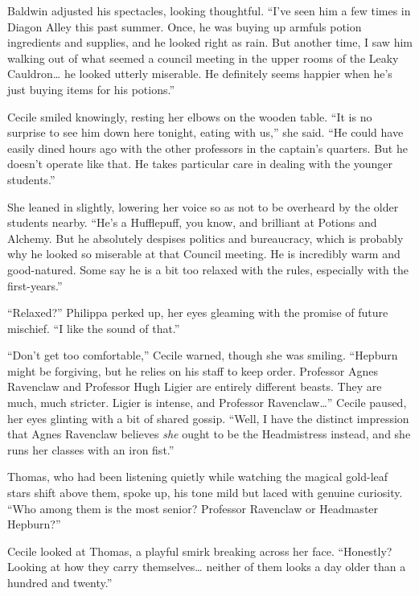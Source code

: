 Baldwin adjusted his spectacles, looking thoughtful. \enquote{I've seen him a few times in Diagon Alley this past summer. Once, he was buying up armfuls potion ingredients and supplies, and he looked right as rain. But another time, I saw him walking out of what seemed a council meeting in the upper rooms of the Leaky Cauldron\ldots{} he looked utterly miserable. He definitely seems happier when he's just buying items for his potions.}

Cecile smiled knowingly, resting her elbows on the wooden table. \enquote{It is no surprise to see him down here tonight, eating with us,} she said. \enquote{He could have easily dined hours ago with the other professors in the captain's quarters. But he doesn't operate like that. He takes particular care in dealing with the younger students.}

She leaned in slightly, lowering her voice so as not to be overheard by the older students nearby. \enquote{He's a Hufflepuff, you know, and brilliant at Potions and Alchemy. But he absolutely despises politics and bureaucracy, which is probably why he looked so miserable at that Council meeting. He is incredibly warm and good-natured. Some say he is a bit too relaxed with the rules, especially with the first-years.}

\enquote{Relaxed?} Philippa perked up, her eyes gleaming with the promise of future mischief. \enquote{I like the sound of that.}

\enquote{Don't get too comfortable,} Cecile warned, though she was smiling. \enquote{Hepburn might be forgiving, but he relies on his staff to keep order. Professor Agnes Ravenclaw and Professor Hugh Ligier are entirely different beasts. They are much, much stricter. Ligier is intense, and Professor Ravenclaw\ldots{}} Cecile paused, her eyes glinting with a bit of shared gossip. \enquote{Well, I have the distinct impression that Agnes Ravenclaw believes \textit{she} ought to be the Headmistress instead, and she runs her classes with an iron fist.}

Thomas, who had been listening quietly while watching the magical gold-leaf stars shift above them, spoke up, his tone mild but laced with genuine curiosity. \enquote{Who among them is the most senior? Professor Ravenclaw or Headmaster Hepburn?}

Cecile looked at Thomas, a playful smirk breaking across her face. \enquote{Honestly? Looking at how they carry themselves\ldots{} neither of them looks a day older than a hundred and twenty.}

